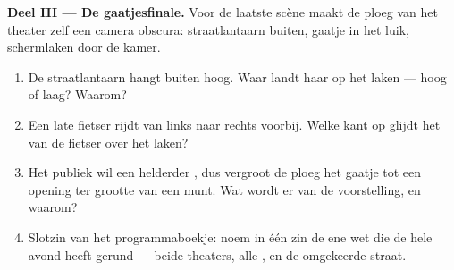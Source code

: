\begin{problem}
\medskip\noindent\textbf{Deel III --- De gaatjesfinale.}
Voor de laatste scène maakt de ploeg van het theater zelf een camera
obscura: straatlantaarn buiten, gaatje in het luik, schermlaken door
de kamer.
\begin{enumerate}[resume]
  \item De straatlantaarn hangt buiten hoog. Waar landt haar
         op het laken --- hoog of laag? Waarom?
  \item Een late fietser rijdt van links naar rechts voorbij. Welke
        kant op glijdt het  van de fietser over het laken?
  \item Het publiek wil een helderder , dus vergroot de ploeg
        het gaatje tot een opening ter grootte van een munt. Wat
        wordt er van de voorstelling, en waarom?
  \item Slotzin van het programmaboekje: noem in één zin de ene wet
        die de hele avond heeft gerund --- beide theaters, alle
        , en de omgekeerde straat.
\end{enumerate}
\end{problem}
